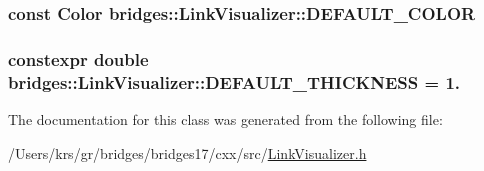 \subsubsection[{D\+E\+F\+A\+U\+L\+T\+\_\+\+C\+O\+L\+O\+R}]{\setlength{\rightskip}{0pt plus 5cm}const {\bf Color} bridges\+::\+Link\+Visualizer\+::\+D\+E\+F\+A\+U\+L\+T\+\_\+\+C\+O\+L\+O\+R\hspace{0.3cm}{\ttfamily [static]}}\label{classbridges_1_1_link_visualizer_a7698ad5b243041377d81152a339d1282}
\hypertarget{classbridges_1_1_link_visualizer_ab790c33080c769008114db34d5ec8950}{}
\subsubsection[{D\+E\+F\+A\+U\+L\+T\+\_\+\+T\+H\+I\+C\+K\+N\+E\+S\+S}]{\setlength{\rightskip}{0pt plus 5cm}constexpr double bridges\+::\+Link\+Visualizer\+::\+D\+E\+F\+A\+U\+L\+T\+\_\+\+T\+H\+I\+C\+K\+N\+E\+S\+S = 1.\hspace{0.3cm}{\ttfamily [static]}}\label{classbridges_1_1_link_visualizer_ab790c33080c769008114db34d5ec8950}


The documentation for this class was generated from the following file\+:\begin{DoxyCompactItemize}
\item 
/\+Users/krs/gr/bridges/bridges17/cxx/src/\hyperlink{_link_visualizer_8h}{Link\+Visualizer.\+h}\end{DoxyCompactItemize}
